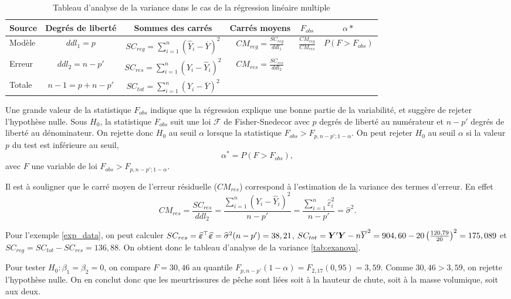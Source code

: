 \begin{table}[htb!]
\caption{Tableau d'analyse de la variance dans le cas de la régression linéaire multiple}\label{table:anova}
\centering
\renewcommand{\arraystretch}{1.6}
\begin{tabular}{lccccc}\hline
Source & Degrés de liberté & Sommes des carrés & Carrés moyens & $F_{obs}$ & $\alpha*$\\ \hline
Modèle & $ddl_1=p$ &
$SC_{reg}=\sum\limits_{i=1}^n(\widehat Y_i-\overline Y)^2$ & $CM_{reg}=\frac{\displaystyle SC_{reg}}{\displaystyle ddl_1}$ & $\frac{\displaystyle CM_{reg}}{\displaystyle CM_{res}}$ & $P(F > F_{obs})$\\
Erreur & $ddl_2=n-p'$ & $SC_{res}=\sum\limits_{i=1}^n(Y_i-\widehat Y_i)^2$ & $CM_{res}=\frac{\displaystyle SC_{res}}{\displaystyle ddl_2}$ & &\\
\hline Totale & $n-1=p+n-p'$ & $SC_{tot}=\sum\limits_{i=1}^n(Y_i-\overline Y)^2$ & & &\\
\hline
\end{tabular}
\end{table}

Une grande valeur de la statistique $F_{obs}$ indique que la régression explique une bonne partie de la variabilité, et suggère de rejeter l'hypothèse nulle. Sous $H_0$, la statistique $F_{obs}$ suit une loi $\mathcal F$ de Fisher-Snedecor avec $p$ degrés de liberté au numérateur et $n-p'$ degrés de liberté au
dénominateur. On rejette donc $H_0$ au seuil $\alpha$ lorsque la statistique
$ F_{obs} > F_{p,n-p';1-\alpha}$. On peut rejeter $H_0$ au seuil $\alpha$ si la valeur $p$ du test est inférieure au seuil,
$$ \alpha^* = P\left(F > F_{obs}\right), $$
avec $F$ une variable de loi $ F_{obs} > F_{p,n-p';1-\alpha}$.


\begin{remarque}
Il est à souligner que le carré moyen de l'erreur résiduelle ($CM_{res}$) correspond à l'estimation de la variance des termes d'erreur. En effet
 \[CM_{res}=\frac{SC_{res}}{ddl_2}= \frac{\sum\limits_{i=1}^n (Y_i-\widehat{Y}_i)^2}{n-p'}=\frac{\sum\limits_{i=1}^n \widehat\varepsilon_i^2}{n-p'}=\widehat\sigma^2.
\]
\end{remarque}

\begin{exemple}
Pour l'exemple \ref{exp_data}, on peut calculer  $SC_{res}=\widehat{\bm\varepsilon}^\top\widehat{\bm\varepsilon}=\widehat\sigma^2 (n-p')=38,21$, $SC_{tot}=\bm{Y}'\bm{Y}-n\overline{Y}^2=904,60-20\left(\frac{120,79}{20}\right)^2=175,089$ et $SC_{reg}=SC_{tot}-SC_{res}=136,88.$ On obtient donc le tableau d'analyse de la variance \ref{tab:exanova}.

Pour tester $H_0:\beta_1=\beta_2=0$, on compare $F=30,46$ au quantile $F_{p,n-p'}(1-\alpha)=F_{2,17}(0,95)=3,59$. Comme $30,46>3,59$, on rejette l'hypothèse nulle. On en conclut donc que les meurtrissures de pêche sont liées soit à la hauteur de chute, soit à la masse volumique, soit aux deux.
\end{exemple}

